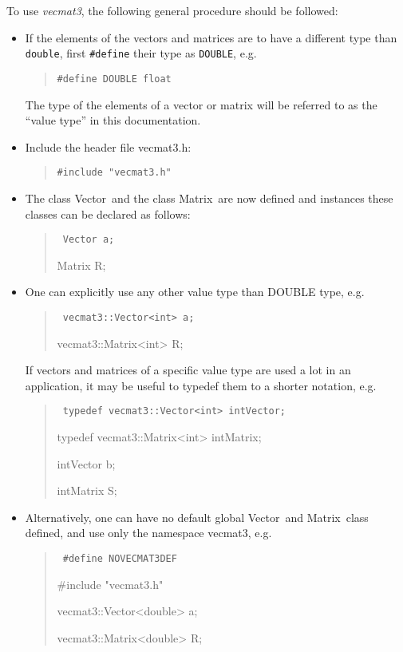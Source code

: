 \documentclass[12pt,twoside]{article}
\newcommand{\Vector}{{Vector}}
\newcommand{\Matrix}{{Matrix}}
\begin{document}
To use \emph{vecmat3}, the following general procedure should be
followed: 

\begin{itemize}
  \item If the elements of the vectors and matrices are to have a
  different type than \texttt{double}, first \texttt{\#define} their type as
  \texttt{DOUBLE}, e.g.
  \begin{quote}
    \tt \#define DOUBLE float
  \end{quote}
  The type of the elements of a vector or matrix will be referred to
  as the ``value type'' in this documentation.
  \item Include the header file vecmat3.h:
  \begin{quote}
    \tt \#include "vecmat3.h"
  \end{quote}

  \item The class \Vector\ and the class \Matrix\ are now
  defined and instances these classes can be declared as follows:
    \begin{quote}\tt
      Vector a;

      Matrix R;
    \end{quote}
    \item One can explicitly use any other value type
      than DOUBLE type, e.g.
    \begin{quote}\tt
      vecmat3::Vector<int> a;

      vecmat3::Matrix<int> R;
    \end{quote}
    If vectors and matrices of a specific value type are used a lot in an
    application, it may be useful to typedef them to a shorter
    notation, e.g.
    \begin{quote}\tt
      typedef vecmat3::Vector<int> intVector;

      typedef vecmat3::Matrix<int> intMatrix;

      intVector b;

      intMatrix S;
    \end{quote}
  \item Alternatively, one can have no default global \Vector\ and \Matrix\ class defined, and use only the namespace vecmat3, e.g.
    \begin{quote}\tt
      \#define NOVECMAT3DEF

      \#include "vecmat3.h"      

      vecmat3::Vector<double> a;

      vecmat3::Matrix<double> R;
    \end{quote}


\end{itemize}
\end{document}
